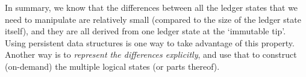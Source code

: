 \documentclass[11pt,a4paper]{article}
\begin{document}
\begin{center}
\end{center}
In summary, we know that the differences between all the ledger states that we
need to manipulate are relatively small (compared to the size of the ledger
state itself), and they are all derived from one ledger state at the `immutable
tip'. Using persistent data structures is one way to take advantage of this
property. Another way is to \emph{represent the differences explicitly}, and
use that to construct (on-demand) the multiple logical states (or parts
thereof).
\end{document}
